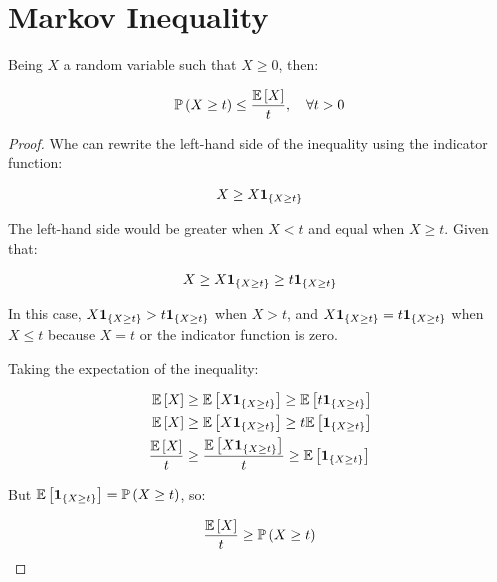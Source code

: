 \section{Markov Inequality}

Being $X$ a random variable such that $X \geq 0$, then:

\begin{equation*}
\mathbb{P}\left(X \geq t\right) \leq \frac{\mathbb{E}\left[X\right]}{t}, \quad \forall t > 0
\end{equation*}

\begin{proof}
Whe can rewrite the left-hand side of the inequality using the indicator function:

\begin{align*}
X \geq X \mathbf{1}_{\{X \geq t\}}
\end{align*}

The left-hand side would be greater when $X < t$ and equal when $X \geq t$. Given that:

\begin{align*}
X \geq X \mathbf{1}_{\{X \geq t\}} \geq t \mathbf{1}_{\{X \geq t\}}
\end{align*}

In this case, $X \mathbf{1}_{\{X \geq t\}} > t \mathbf{1}_{\{X \geq t\}}$ when $X > t$, and $X \mathbf{1}_{\{X \geq t\}} = t \mathbf{1}_{\{X \geq t\}}$ when $X \leq t$ because $X = t$ or the indicator function is zero.

Taking the expectation of the inequality:

\begin{align*}
\mathbb{E}\left[X\right] &\geq \mathbb{E}\left[X \mathbf{1}_{\{X \geq t\}}\right] \geq \mathbb{E}\left[t \mathbf{1}_{\{X \geq t\}}\right] \\
\mathbb{E}\left[X\right] &\geq \mathbb{E}\left[X \mathbf{1}_{\{X \geq t\}}\right] \geq t \mathbb{E}\left[\mathbf{1}_{\{X \geq t\}}\right] \\
\frac{\mathbb{E}\left[X\right]}{t} &\geq \frac{\mathbb{E}\left[X \mathbf{1}_{\{X \geq t\}}\right]}{t} \geq \mathbb{E}\left[\mathbf{1}_{\{X \geq t\}}\right] \\
\end{align*}

But $\mathbb{E}\left[\mathbf{1}_{\{X \geq t\}}\right] = \mathbb{P}\left(X \geq t\right)$, so:

\begin{align*}
\frac{\mathbb{E}\left[X\right]}{t} &\geq \mathbb{P}\left(X \geq t\right) \\
\end{align*}

\end{proof}
